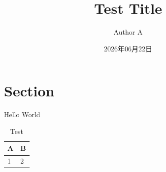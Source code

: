 \documentclass[twocolumn,dark,nomath]{harryopo-paper}
\title{Test Title}
\author{Author A}
\date{2026年06月22日}
\begin{document}
\maketitlewithabstract
\section{Section}
Hello World
\begin{table}[htbp]
  \centering
  \caption{Test}
  \begin{tabular}{ll}
    \toprule A & B \\ \midrule 1 & 2 \\ \bottomrule
  \end{tabular}
\end{table}
\end{document}
